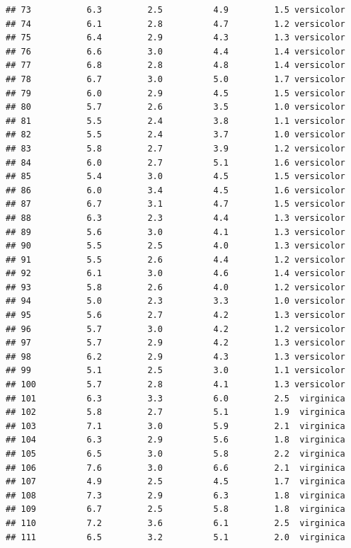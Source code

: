 \documentclass[
]{book}
\begin{document}
\begin{verbatim}
## 73           6.3         2.5          4.9         1.5 versicolor
## 74           6.1         2.8          4.7         1.2 versicolor
## 75           6.4         2.9          4.3         1.3 versicolor
## 76           6.6         3.0          4.4         1.4 versicolor
## 77           6.8         2.8          4.8         1.4 versicolor
## 78           6.7         3.0          5.0         1.7 versicolor
## 79           6.0         2.9          4.5         1.5 versicolor
## 80           5.7         2.6          3.5         1.0 versicolor
## 81           5.5         2.4          3.8         1.1 versicolor
## 82           5.5         2.4          3.7         1.0 versicolor
## 83           5.8         2.7          3.9         1.2 versicolor
## 84           6.0         2.7          5.1         1.6 versicolor
## 85           5.4         3.0          4.5         1.5 versicolor
## 86           6.0         3.4          4.5         1.6 versicolor
## 87           6.7         3.1          4.7         1.5 versicolor
## 88           6.3         2.3          4.4         1.3 versicolor
## 89           5.6         3.0          4.1         1.3 versicolor
## 90           5.5         2.5          4.0         1.3 versicolor
## 91           5.5         2.6          4.4         1.2 versicolor
## 92           6.1         3.0          4.6         1.4 versicolor
## 93           5.8         2.6          4.0         1.2 versicolor
## 94           5.0         2.3          3.3         1.0 versicolor
## 95           5.6         2.7          4.2         1.3 versicolor
## 96           5.7         3.0          4.2         1.2 versicolor
## 97           5.7         2.9          4.2         1.3 versicolor
## 98           6.2         2.9          4.3         1.3 versicolor
## 99           5.1         2.5          3.0         1.1 versicolor
## 100          5.7         2.8          4.1         1.3 versicolor
## 101          6.3         3.3          6.0         2.5  virginica
## 102          5.8         2.7          5.1         1.9  virginica
## 103          7.1         3.0          5.9         2.1  virginica
## 104          6.3         2.9          5.6         1.8  virginica
## 105          6.5         3.0          5.8         2.2  virginica
## 106          7.6         3.0          6.6         2.1  virginica
## 107          4.9         2.5          4.5         1.7  virginica
## 108          7.3         2.9          6.3         1.8  virginica
## 109          6.7         2.5          5.8         1.8  virginica
## 110          7.2         3.6          6.1         2.5  virginica
## 111          6.5         3.2          5.1         2.0  virginica

\end{verbatim}
\end{document}
